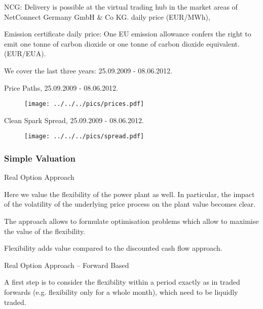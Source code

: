 	NCG: Delivery is possible at the virtual trading hub in the market areas of
NetConnect Germany GmbH \& Co KG. daily price (EUR/MWh),


	Emission certificate daily price: One EU emission allowance confers the right to emit one tonne of carbon dioxide or one tonne of
carbon dioxide equivalent. (EUR/EUA).


	We cover the last three years: 25.09.2009 - 08.06.2012.





{Price Paths, 25.09.2009 - 08.06.2012.}
\begin{figure}[htp]
\centering
\texttt{[image: ../../../pics/prices.pdf]}
\label{prices}
\end{figure}

{Clean Spark Spread, 25.09.2009 - 08.06.2012.}
\begin{figure}[htp]
\centering
\texttt{[image: ../../../pics/spread.pdf]}
\label{spread}
\end{figure}

\subsubsection{Simple Valuation}

{Real Option Approach}






	Here we value the flexibility of the power plant as well. In particular, the impact of the volatility of the underlying price process on the plant value becomes clear.


	The approach allows to formulate optimisation problems which allow to maximise the value of the flexibility.


	Flexibility adds value compared to the discounted cash flow approach.





{Real Option Approach -- Forward Based}






	A first step is to consider the flexibility within a period exactly as in traded forwards (e.g. flexibility only for a whole month), which need to be liquidly traded.


